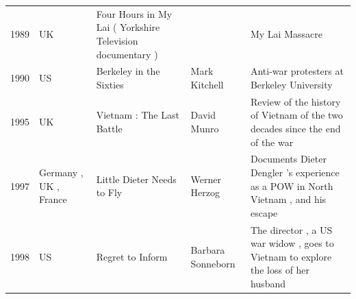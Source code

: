 \documentclass{article}
\begin{document}
\begin{tabular}{lllll}
1989 & UK & Four Hours in My Lai ( Yorkshire Television documentary ) &  & My Lai Massacre \\
1990 & US & Berkeley in the Sixties & Mark Kitchell & Anti-war protesters at Berkeley University \\
1995 & UK & Vietnam : The Last Battle & David Munro & Review of the history of Vietnam of the two decades since the end of the war \\
1997 & Germany , UK , France & Little Dieter Needs to Fly & Werner Herzog & Documents Dieter Dengler 's experience as a POW in North Vietnam , and his escape \\
1998 & US & Regret to Inform & Barbara Sonneborn & The director , a US war widow , goes to Vietnam to explore the loss of her husband \\
\bottomrule
\end{tabular}
\end{document}
